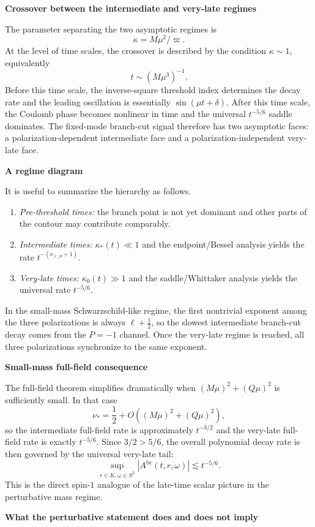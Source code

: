 \documentclass[12pt]{article}
\numberwithin{equation}{section}
\theoremstyle{plain}
\theoremstyle{definition}
\theoremstyle{remark}
\newcommand{\bc}{\mathrm{bc}}
\newcommand{\vp}{\varpi}
\newcommand{\kap}{\kappa}
\newcommand{\abs}[1]{\left|#1\right|}
\newcommand{\appheading}[1]{\par\medskip\noindent\textbf{#1}\par\smallskip\noindent}
\begin{document}
\appheading{Crossover between the intermediate and very-late regimes}

The parameter separating the two asymptotic regimes is
\[
   \kap=M\mu^2/\vp.
\]
At the level of time scales, the crossover is described by the condition $\kap\sim1$, equivalently
\[
   t\sim (M\mu^3)^{-1}.
\]
Before this time scale, the inverse-square threshold index determines the decay rate and the leading oscillation is essentially $\sin(\mu t+\delta)$.  After this time scale, the Coulomb phase becomes nonlinear in time and the universal $t^{-5/6}$ saddle dominates.  The fixed-mode branch-cut signal therefore has two asymptotic faces: a polarization-dependent intermediate face and a polarization-independent very-late face.

\appheading{A regime diagram}

It is useful to summarize the hierarchy as follows.
\begin{enumerate}[label=\textnormal{(\roman*)}]
   \item \emph{Pre-threshold times:} the branch point is not yet dominant and other parts of the contour may contribute comparably.
   \item \emph{Intermediate times:} $\kap_*(t)\ll1$ and the endpoint/Bessel analysis yields the rate $t^{-(\nu_{\ell,P}+1)}$.
   \item \emph{Very-late times:} $\kap_0(t)\gg1$ and the saddle/Whittaker analysis yields the universal rate $t^{-5/6}$.
\end{enumerate}
In the small-mass Schwarzschild-like regime, the first nontrivial exponent among the three polarizations is always $\ell+\frac12$, so the slowest intermediate branch-cut decay comes from the $P=-1$ channel.  Once the very-late regime is reached, all three polarizations synchronize to the same exponent.

\appheading{Small-mass full-field consequence}

The full-field theorem simplifies dramatically when $(M\mu)^2+(Q\mu)^2$ is sufficiently small.  In that case
\[
   \nu_*=\frac12+O((M\mu)^2+(Q\mu)^2),
\]
so the intermediate full-field rate is approximately $t^{-3/2}$ and the very-late full-field rate is exactly $t^{-5/6}$.  Since $3/2>5/6$, the overall polynomial decay rate is then governed by the universal very-late tail:
\[
   \sup_{r\in K,\omega\in S^2}\abs{A^{\bc}(t,r,\omega)}
   \lesssim
   t^{-5/6}.
\]
This is the direct spin-$1$ analogue of the late-time scalar picture in the perturbative mass regime.

\appheading{What the perturbative statement does and does not imply}
\end{document}
